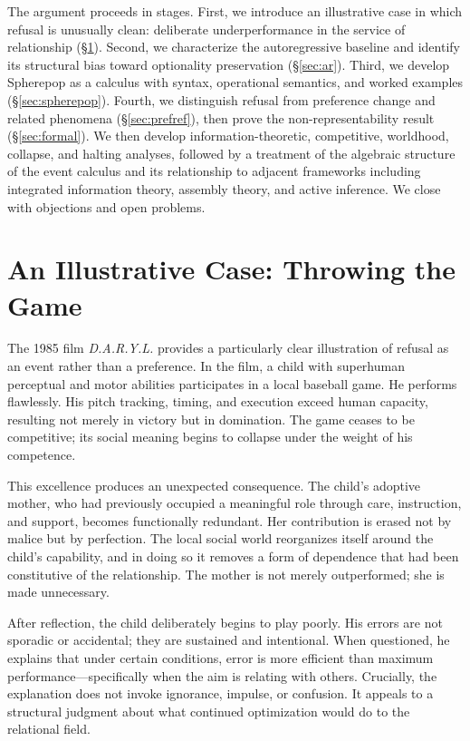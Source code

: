 \documentclass[11pt]{article}
\begin{document}
The argument proceeds in stages. First, we introduce an illustrative case in
which refusal is unusually clean: deliberate underperformance in the service of
relationship (\S\ref{sec:daryl}). Second, we characterize the autoregressive
baseline and identify its structural bias toward optionality preservation
(\S\ref{sec:ar}). Third, we develop Spherepop as a calculus with syntax,
operational semantics, and worked examples (\S\ref{sec:spherepop}). Fourth, we
distinguish refusal from preference change and related phenomena
(\S\ref{sec:prefref}), then prove the non-representability result
(\S\ref{sec:formal}). We then develop information-theoretic, competitive,
worldhood, collapse, and halting analyses, followed by a treatment of the
algebraic structure of the event calculus and its relationship to adjacent
frameworks including integrated information theory, assembly theory, and active
inference. We close with objections and open problems.

\section{An Illustrative Case: Throwing the Game}
\label{sec:daryl}

The 1985 film \emph{D.A.R.Y.L.} provides a particularly clear illustration of
refusal as an event rather than a preference. In the film, a child with
superhuman perceptual and motor abilities participates in a local baseball game.
He performs flawlessly. His pitch tracking, timing, and execution exceed human
capacity, resulting not merely in victory but in domination. The game ceases to
be competitive; its social meaning begins to collapse under the weight of his
competence.

This excellence produces an unexpected consequence. The child's adoptive mother,
who had previously occupied a meaningful role through care, instruction, and
support, becomes functionally redundant. Her contribution is erased not by
malice but by perfection. The local social world reorganizes itself around the
child's capability, and in doing so it removes a form of dependence that had
been constitutive of the relationship. The mother is not merely outperformed;
she is made unnecessary.

After reflection, the child deliberately begins to play poorly. His errors are
not sporadic or accidental; they are sustained and intentional. When questioned,
he explains that under certain conditions, error is more efficient than maximum
performance---specifically when the aim is relating with others. Crucially, the
explanation does not invoke ignorance, impulse, or confusion. It appeals to a
structural judgment about what continued optimization would do to the relational
field.
\end{document}
